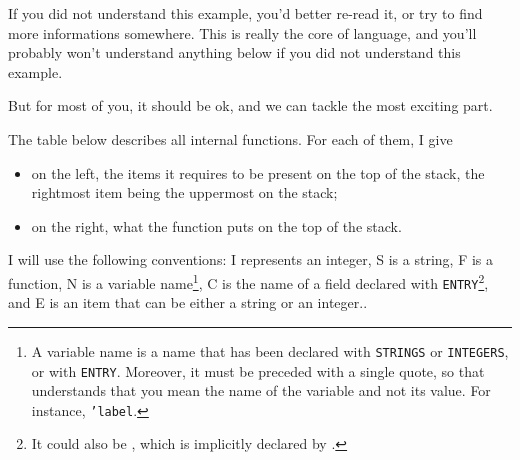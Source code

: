 If you did not understand this example, you'd better re-read it, or try to
find more informations somewhere. This is really the core of \bt language, and
you'll probably won't understand anything below if you did not understand
this example. 

But for most of you, it should be ok, and we can tackle the most exciting part.



The table below describes all internal functions.
For each of them, I give
\begin{itemize}
\item on the left, the items it requires to be present on the top of the
stack, the rightmost item being the uppermost on the stack;
\item on the right, what the function puts on the top of the stack.
\end{itemize}
I will use the following conventions: \el I represents an integer, \el S is a
string, \el F is a function, \el N is a variable name\footnote{A variable name
  is a name that has been declared with \texttt{STRINGS} or \texttt{INTEGERS},
  or with \texttt{ENTRY}.
  Moreover, it must be preceded with a single quote, so that \bt understands
  that you mean the name of the variable and not its value. For instance,
  \texttt{'label}.}, \el C is the name of a field declared with
\texttt{ENTRY}\footnote{It could also be , which is implicitly
  declared by \bt.}, and \el E is an item that can be either a string or an integer.. 

